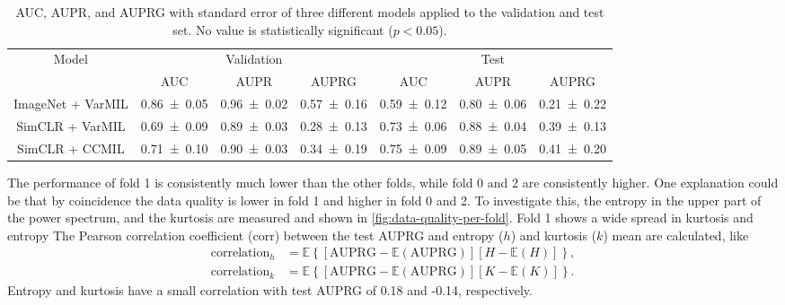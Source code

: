 \begin{table}
    \caption[AUC, AUPR, and AUPRG]{
        AUC, AUPR, and AUPRG with standard error of three different models applied to the validation and test set.
        No value is statistically significant ($p < 0.05$).
    }
    \label{tab:performance}
    \begin{tabular*}{\linewidth}{@{\extracolsep{\fill}}*{7}{c}}
        \toprule
        \multirow{2}{*}{Model} & \multicolumn{3}{c}{Validation} & \multicolumn{3}{c}{Test} \\
        \cmidrule{2-4} \cmidrule{5-7}
        & AUC & AUPR & AUPRG & AUC & AUPR & AUPRG \\
        \midrule
        ImageNet + VarMIL & \num[uncertainty-mode=compact]{0.86 \pm 0.05} & \num[uncertainty-mode=compact]{0.96 \pm 0.02} & \num[uncertainty-mode=compact]{0.57 \pm 0.16} & \num[uncertainty-mode=compact]{0.59 \pm 0.12} & \num[uncertainty-mode=compact]{0.80 \pm 0.06} & \num[uncertainty-mode=compact]{0.21 \pm 0.22} \\
        SimCLR + VarMIL & \num[uncertainty-mode=compact]{0.69 \pm 0.09} & \num[uncertainty-mode=compact]{0.89 \pm 0.03} & \num[uncertainty-mode=compact]{0.28 \pm 0.13} & \num[uncertainty-mode=compact]{0.73 \pm 0.06} & \num[uncertainty-mode=compact]{0.88 \pm 0.04} & \num[uncertainty-mode=compact]{0.39 \pm 0.13} \\
        SimCLR + CCMIL & \num[uncertainty-mode=compact]{0.71 \pm 0.10} & \num[uncertainty-mode=compact]{0.90 \pm 0.03} & \num[uncertainty-mode=compact]{0.34 \pm 0.19} & \num[uncertainty-mode=compact]{0.75 \pm 0.09} & \num[uncertainty-mode=compact]{0.89 \pm 0.05} & \num[uncertainty-mode=compact]{0.41 \pm 0.20} \\
        \bottomrule
    \end{tabular*}
\end{table}

The performance of fold 1 is consistently much lower than the other folds, while fold 0 and 2 are consistently higher.
One explanation could be that by coincidence the data quality is lower in fold 1 and higher in fold 0 and 2.
To investigate this, the entropy in the upper part of the power spectrum, and the kurtosis are measured and shown in \cref{fig:data-quality-per-fold}.
Fold 1 shows a wide spread in kurtosis and entropy
The Pearson correlation coefficient ($\mathrm{corr}$) between the test AUPRG and entropy ($h$) and kurtosis ($k$) mean are calculated, like
\begin{align}
    \mathrm{correlation}_h &= \mathbb{E}\left\{[\mathrm{AUPRG} - \mathbb{E}\left(\mathrm{AUPRG} \right)][H - \mathbb{E}\left(H\right)]\right\}, \\
    \mathrm{correlation}_k &= \mathbb{E}\left\{[\mathrm{AUPRG} - \mathbb{E}\left(\mathrm{AUPRG} \right)][K - \mathbb{E}\left(K\right)]\right\}.
\end{align}
Entropy and kurtosis have a small correlation with test AUPRG of 0.18 and -0.14, respectively.

